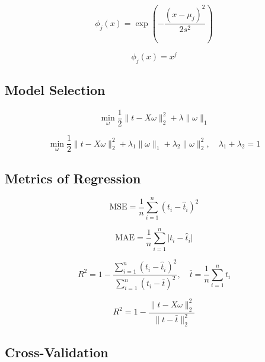 \documentclass[10pt]{article}
\begin{document}
\begin{multicols}{2}
\begin{equation}
    \phi_{j}(x) = \exp\left(-\frac{(x - \mu_{j})^{2}}{2s^{2}}\right)
\end{equation}

\begin{equation}
    \phi_{j}(x) = x^{j}
\end{equation}

\subsection*{Model Selection}
\begin{equation}
    \label{eq:lasso}
    \min_{\omega} \frac{1}{2} \lVert{t - X\omega} \rVert^{2}_{2} + \lambda \lVert{\omega} \rVert_{1}
\end{equation}

\begin{equation}
    \label{eq:elastic-net}
    \min_{\omega} \frac{1}{2} \lVert{t - X\omega} \rVert^{2}_{2} + \lambda_{1} \lVert{\omega} \rVert_{1} + \lambda_{2} \lVert{\omega} \rVert^{2}_{2}, \quad \lambda_{1} + \lambda_{2} = 1
\end{equation}

\subsection*{Metrics of Regression}
\begin{equation}
    \label{eq:mse}
    \text{MSE} = \frac{1}{n} \sum_{i=1}^{n} (t_{i} - \hat{t}_{i})^{2}
\end{equation}

\begin{equation}
    \label{eq:mae}
    \text{MAE} = \frac{1}{n} \sum_{i=1}^{n} \lvert t_{i} - \hat{t}_{i} \rvert
\end{equation}

\begin{equation}
    \label{eq:r-squared}
    R^{2} = 1 - \frac{\sum_{i=1}^{n} (t_{i} - \hat{t}_{i})^{2}}{\sum_{i=1}^{n} (t_{i} - \bar{t})^{2}}, \quad \bar{t} = \frac{1}{n} \sum_{i=1}^{n} t_{i}
\end{equation}

\begin{equation}
    \label{eq:r-squared-2}
    R^{2} = 1 - \frac{\lVert{t - X\omega} \rVert^{2}_{2}}{\lVert{t - \bar{t}} \rVert^{2}_{2}}
\end{equation}


\subsection*{Cross-Validation}

\end{multicols}
\end{document}
